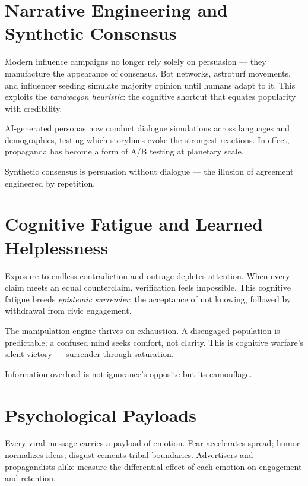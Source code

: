 \documentclass[12pt,twoside]{book}
\begin{document}
\section{Narrative Engineering and Synthetic Consensus}

Modern influence campaigns no longer rely solely on persuasion — they manufacture the
appearance of consensus.  
Bot networks, astroturf movements, and influencer seeding simulate majority opinion until
humans adapt to it.  
This exploits the \emph{bandwagon heuristic}: the cognitive shortcut that equates popularity with credibility.

AI-generated personas now conduct dialogue simulations across languages and demographics,
testing which storylines evoke the strongest reactions.  
In effect, propaganda has become a form of A/B testing at planetary scale.\\

\begin{keyidea}
Synthetic consensus is persuasion without dialogue — the illusion of agreement engineered by repetition.
\end{keyidea}

\section{Cognitive Fatigue and Learned Helplessness}

Exposure to endless contradiction and outrage depletes attention.  
When every claim meets an equal counterclaim, verification feels impossible.
This cognitive fatigue breeds \emph{epistemic surrender}: the acceptance of not knowing,
followed by withdrawal from civic engagement.

The manipulation engine thrives on exhaustion.
A disengaged population is predictable; a confused mind seeks comfort, not clarity.
This is cognitive warfare’s silent victory — surrender through saturation.\\

\begin{keyidea}
Information overload is not ignorance’s opposite but its camouflage.
\end{keyidea}

\section{Psychological Payloads}

Every viral message carries a payload of emotion.
Fear accelerates spread; humor normalizes ideas; disgust cements tribal boundaries.
Advertisers and propagandists alike measure the differential effect of each emotion on
engagement and retention.
\end{document}
